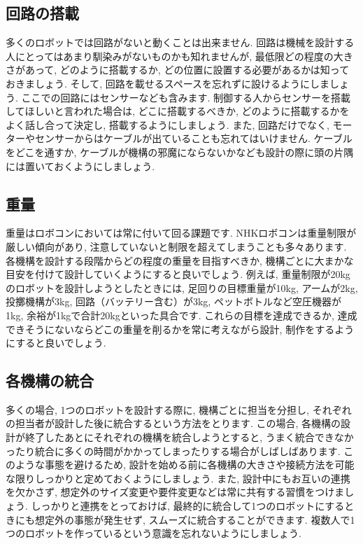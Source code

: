 \subsection{回路の搭載}
多くのロボットでは回路がないと動くことは出来ません. 回路は機械を設計する人にとってはあまり馴染みがないものかも知れませんが, 最低限どの程度の大きさがあって, どのように搭載するか, どの位置に設置する必要があるかは知っておきましょう. そして, 回路を載せるスペースを忘れずに設けるようにしましょう. ここでの回路にはセンサーなども含みます. 制御する人からセンサーを搭載してほしいと言われた場合は, どこに搭載するべきか, どのように搭載するかをよく話し合って決定し, 搭載するようにしましょう.
また, 回路だけでなく, モーターやセンサーからはケーブルが出ていることも忘れてはいけません. ケーブルをどこを通すか, ケーブルが機構の邪魔にならないかなども設計の際に頭の片隅には置いておくようにしましょう. 
\subsection{重量}
重量はロボコンにおいては常に付いて回る課題です. NHKロボコンは重量制限が厳しい傾向があり, 注意していないと制限を超えてしまうことも多々あります. 各機構を設計する段階からどの程度の重量を目指すべきか, 機構ごとに大まかな目安を付けて設計していくようにすると良いでしょう. 
例えば, 重量制限が20kgのロボットを設計しようとしたときには, 足回りの目標重量が10kg, アームが2kg, 投擲機構が3kg, 回路（バッテリー含む）が3kg, ペットボトルなど空圧機器が1kg, 余裕が1kgで合計20kgといった具合です. 
これらの目標を達成できるか, 達成できそうにないならどこの重量を削るかを常に考えながら設計, 制作をするようにすると良いでしょう. 
\subsection{各機構の統合}
多くの場合, 1つのロボットを設計する際に, 機構ごとに担当を分担し, それぞれの担当者が設計した後に統合するという方法をとります. この場合, 各機構の設計が終了したあとにそれぞれの機構を統合しようとすると, うまく統合できなかったり統合に多くの時間がかかってしまったりする場合がしばしばあります. 
このような事態を避けるため, 設計を始める前に各機構の大きさや接続方法を可能な限りしっかりと定めておくようにしましょう. 
また, 設計中にもお互いの連携を欠かさず, 想定外のサイズ変更や要件変更などは常に共有する習慣をつけましょう. 
しっかりと連携をとっておけば, 最終的に統合して1つのロボットにするときにも想定外の事態が発生せず, スムーズに統合することができます. 複数人で1つのロボットを作っているという意識を忘れないようにしましょう. 
